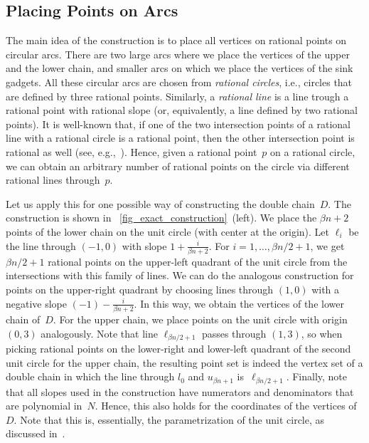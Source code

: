\documentclass[a4paper,11pt]{article}
\begin{document}
\subsection{Placing Points on Arcs}

The main idea of the construction is to place all vertices on rational points on circular arcs.
There are two large arcs where we place the vertices of the upper and the lower chain, and smaller arcs on which we place the vertices of the sink gadgets.
All these circular arcs are chosen from \emph{rational circles}, i.e., circles that are defined by three rational points.
Similarly, a \emph{rational line} is a line trough a rational point with rational slope (or, equivalently, a line defined by two rational points).
It is well-known that, if one of the two intersection points of a rational line with a rational circle is a rational point, then the other intersection point is rational as well (see, e.g.,~\cite[p.~5]{husemoeller}).
Hence, given a rational point~$p$ on a rational circle, we can obtain an arbitrary number of rational points on the circle via different rational lines through~$p$.

Let us apply this for one possible way of constructing the double chain~$D$.
The construction is shown in \figurename~\ref{fig_exact_construction}~(left).
We place the $\beta n + 2$ points of the lower chain on the unit circle (with center at the origin).
Let $\ell_i$ be the line through $(-1,0)$ with slope $1 + \frac{i}{\beta n + 2}$.
For $i = 1, \dots, \beta n / 2 + 1$, we get $\beta n / 2 + 1$ rational points on the upper-left quadrant of the unit circle from the intersections with this family of lines.
We can do the analogous construction for points on the upper-right quadrant by choosing lines through $(1, 0)$ with a negative slope $(-1) - \frac{i}{\beta n+2}$.
In this way, we obtain the vertices of the lower chain of~$D$.
For the upper chain, we place points on the unit circle with origin $(0, 3)$ analogously.
Note that line $\ell_{\beta n / 2 + 1}$ passes through $(1, 3)$, so when picking rational points on the lower-right and lower-left quadrant of the second unit circle for the upper chain, the resulting point set is indeed the vertex set of a double chain in which the line through $l_0$ and $u_{\beta n+1}$ is~$\ell_{\beta n / 2 + 1}$.
Finally, note that all slopes used in the construction have numerators and denominators that are polynomial in~$N$.
Hence, this also holds for the coordinates of the vertices of~$D$.
Note that this is, essentially, the parametrization of the unit circle, as discussed in~\cite{canny}.
\end{document}
